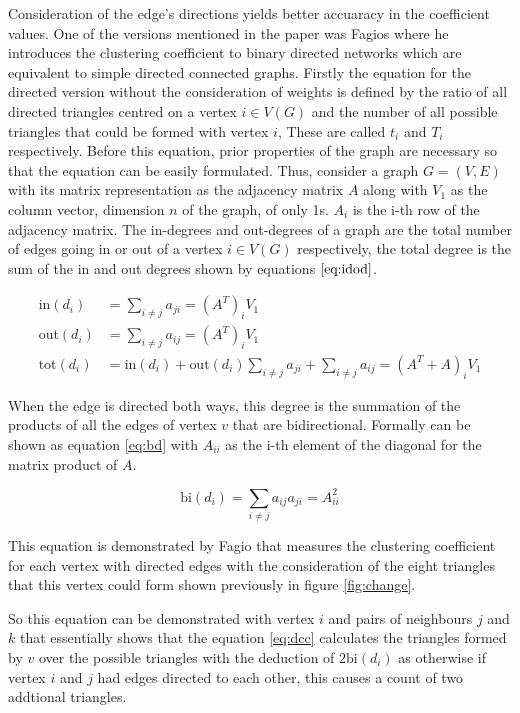 Consideration of the edge's directions yields better accuaracy in the coefficient values. One of the versions mentioned in the paper \cite{PhysRevResearch.3.043124} was Fagios where he introduces the clustering coefficient to binary directed networks which are equivalent to simple directed connected graphs. Firstly the equation for the directed version without the consideration of weights is defined by the ratio of all directed triangles centred on a vertex $i \in V(G)$ and the number of all possible triangles that could be formed with vertex $i$, These are called $t_{i}$ and $T_{i}$ respectively. Before this equation, prior properties of the graph are necessary so that the equation can be easily formulated. Thus, consider a graph $G = (V, E)$ with its matrix representation as the adjacency matrix $A$ along with $V_1$ as the column vector, dimension $n$ of the graph, of only 1s. $A_i$ is the i-th row of the adjacency matrix. The in-degrees and out-degrees of a graph are the total number of edges going in or out of a vertex $i\in V(G)$ respectively, the total degree is the sum of the in and out degrees shown by equations $\ref{eq:idod}$.

\begin{align} \label{eq:idod}
\text{in}(d_i) &= \sum_{i\neq j}a_{ji} = (A^T)_i V_1 \\
\text{out}(d_i) &= \sum_{i\neq j}a_{ij} = (A^T)_i V_1 \nonumber \\
\text{tot}(d_i) &= \text{in}(d_i) + \text{out}(d_i) \sum_{i\neq j}a_{ji} + \sum_{i\neq j}a_{ij} = (A^T + A)_i V_1 \nonumber
\end{align}

When the edge is directed both ways, this degree is the summation of the products of all the edges of vertex $v$ that are bidirectional. Formally can be shown as equation \ref{eq:bd} with $A_{ii}$ as the i-th element of the diagonal for the matrix product of $A$.

\begin{equation} \label{eq:bd}
\text{bi}(d_i) = \sum_{i\neq j}a_{ij}a_{ji} = A_{ii}^2 \nonumber
\end{equation}
 
This equation is demonstrated by Fagio \cite{Fagiolo_2007} that measures the clustering coefficient for each vertex with directed edges with the consideration of the eight triangles that this vertex could form shown previously in figure \ref{fig:change}. 

So this equation can be demonstrated with vertex $i$ and pairs of neighbours $j$ and $k$ that essentially shows that the equation \ref{eq:dcc} calculates the triangles formed by $v$ over the possible triangles with the deduction of $2\text{bi}(d_i)$ as otherwise if vertex $i$ and $j$ had edges directed to each other, this causes a count of two addtional triangles.

